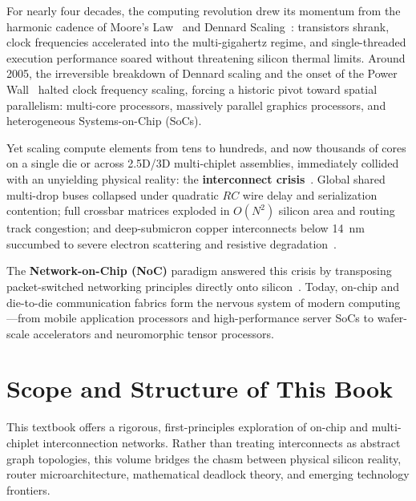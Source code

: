 
\preface

For nearly four decades, the computing revolution drew its momentum from the harmonic cadence of Moore's Law~\cite{Moore1965} and Dennard Scaling~\cite{Dennard1974}: transistors shrank, clock frequencies accelerated into the multi-gigahertz regime, and single-threaded execution performance soared without threatening silicon thermal limits. Around 2005, the irreversible breakdown of Dennard scaling and the onset of the Power Wall~\cite{Borkar1999} halted clock frequency scaling, forcing a historic pivot toward spatial parallelism: multi-core processors, massively parallel graphics processors, and heterogeneous Systems-on-Chip (SoCs).

Yet scaling compute elements from tens to hundreds, and now thousands of cores on a single die or across 2.5D/3D multi-chiplet assemblies, immediately collided with an unyielding physical reality: the \textbf{interconnect crisis}~\cite{Ho2001,Dally2001}. Global shared multi-drop buses collapsed under quadratic $RC$ wire delay and serialization contention; full crossbar matrices exploded in $O(N^2)$ silicon area and routing track congestion; and deep-submicron copper interconnects below 14~nm succumbed to severe electron scattering and resistive degradation~\cite{Mayadas1970}.

The \textbf{Network-on-Chip (NoC)} paradigm answered this crisis by transposing packet-switched networking principles directly onto silicon~\cite{Dally2001,Benini2002}. Today, on-chip and die-to-die communication fabrics form the nervous system of modern computing---from mobile application processors and high-performance server SoCs to wafer-scale accelerators and neuromorphic tensor processors.

\section*{Scope and Structure of This Book}
This textbook offers a rigorous, first-principles exploration of on-chip and multi-chiplet interconnection networks. Rather than treating interconnects as abstract graph topologies, this volume bridges the chasm between physical silicon reality, router microarchitecture, mathematical deadlock theory, and emerging technology frontiers.

